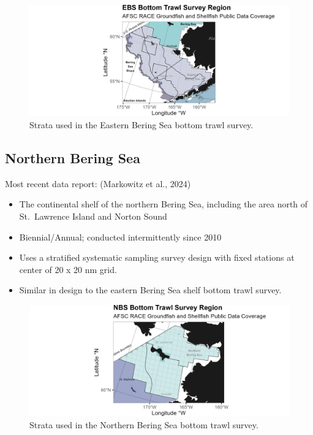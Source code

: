 \documentclass[
  letterpaper,
  oneside,
  open=any]{scrbook}
\providecommand{\tightlist}{%
  \setlength{\itemsep}{0pt}\setlength{\parskip}{0pt}}\usepackage{longtable,booktabs,array}
\begin{document}
\begin{figure}[H]

{\centering \includegraphics[width=7in,height=\textheight]{content/../img/survey_plot_ebs.png}

}

\caption{Strata used in the Eastern Bering Sea bottom trawl survey.}

\end{figure}%

\subsection{\texorpdfstring{\textbf{Northern Bering
Sea}}{Northern Bering Sea}}\label{northern-bering-sea}

Most recent data report: (Markowitz et al., 2024)

\begin{itemize}
\tightlist
\item
  The continental shelf of the northern Bering Sea, including the area
  north of St.~Lawrence Island and Norton Sound
\item
  Biennial/Annual; conducted intermittently since 2010
\item
  Uses a stratified systematic sampling survey design with fixed
  stations at center of 20 x 20 nm grid.
\item
  Similar in design to the eastern Bering Sea shelf bottom trawl survey.
\end{itemize}

\begin{figure}[H]

{\centering \includegraphics[width=7in,height=\textheight]{content/../img/survey_plot_nbs.png}

}

\caption{Strata used in the Northern Bering Sea bottom trawl survey.}

\end{figure}%
\end{document}
